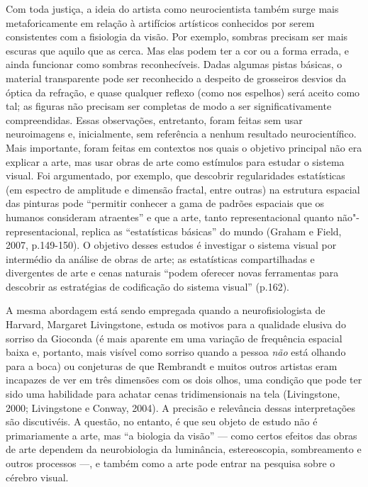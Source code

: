 Com toda justiça, a ideia do artista como neurocientista também surge
mais metaforicamente em relação à artifícios artísticos conhecidos por
serem consistentes com a fisiologia da visão. Por exemplo, sombras
precisam ser mais escuras que aquilo que as cerca. Mas elas podem ter a
cor ou a forma errada, e ainda funcionar como sombras reconhecíveis.
Dadas algumas pistas básicas, o material transparente pode ser
reconhecido a despeito de grosseiros desvios da óptica da refração, e
quase qualquer reflexo (como nos espelhos) será aceito como tal; as
figuras não precisam ser completas de modo a ser significativamente
compreendidas. Essas observações, entretanto, foram feitas sem usar
neuroimagens e, inicialmente, sem referência a nenhum resultado
neurocientífico. Mais importante, foram feitas em contextos nos quais o
objetivo principal não era explicar a arte, mas usar obras de arte como
estímulos para estudar o sistema visual. Foi argumentado, por exemplo,
que descobrir regularidades estatísticas (em espectro de amplitude e
dimensão fractal, entre outras) na estrutura espacial das pinturas pode
``permitir conhecer a gama de padrões espaciais que os humanos
consideram atraentes'' e que a arte, tanto representacional quanto
não"-representacional, replica as ``estatísticas básicas'' do mundo
(Graham e Field, 2007, p.149-150). O objetivo desses estudos é
investigar o sistema visual por intermédio da análise de obras de arte;
as estatísticas compartilhadas e divergentes de arte e cenas naturais
``podem oferecer novas ferramentas para descobrir as estratégias de
codificação do sistema visual'' (p.162).

A mesma abordagem está sendo empregada quando a neurofisiologista de
Harvard, Margaret Livingstone, estuda os motivos para a qualidade
elusiva do sorriso da Gioconda (é mais aparente em uma variação de
frequência espacial baixa e, portanto, mais visível como sorriso quando
a pessoa \emph{não} está olhando para a boca) ou conjeturas de que
Rembrandt e muitos outros artistas eram incapazes de ver em três
dimensões com os dois olhos, uma condição que pode ter sido uma
habilidade para achatar cenas tridimensionais na tela (Livingstone,
2000; Livingstone e Conway, 2004). A precisão e relevância dessas
interpretações são discutivéis. A questão, no entanto, é que seu objeto
de estudo não é primariamente a arte, mas ``a biologia da visão'' ---
como certos efeitos das obras de arte dependem da neurobiologia da
luminância, estereoscopia, sombreamento e outros processos ---, e também
como a arte pode entrar na pesquisa sobre o cérebro visual.

